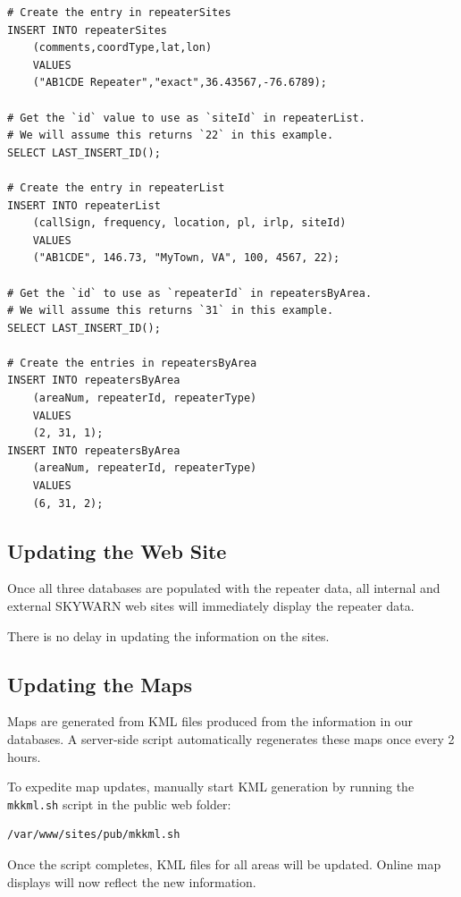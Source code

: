 \documentclass[pdflatex,letterpaper,twoside,12pt]{book}
\begin{document}
\begin{verbatim}
# Create the entry in repeaterSites
INSERT INTO repeaterSites
	(comments,coordType,lat,lon)
	VALUES
	("AB1CDE Repeater","exact",36.43567,-76.6789);

# Get the `id` value to use as `siteId` in repeaterList.
# We will assume this returns `22` in this example.
SELECT LAST_INSERT_ID();

# Create the entry in repeaterList
INSERT INTO repeaterList
	(callSign, frequency, location, pl, irlp, siteId)
	VALUES
	("AB1CDE", 146.73, "MyTown, VA", 100, 4567, 22);

# Get the `id` to use as `repeaterId` in repeatersByArea.
# We will assume this returns `31` in this example.
SELECT LAST_INSERT_ID();

# Create the entries in repeatersByArea
INSERT INTO repeatersByArea
	(areaNum, repeaterId, repeaterType)
	VALUES
	(2, 31, 1);
INSERT INTO repeatersByArea
	(areaNum, repeaterId, repeaterType)
	VALUES
	(6, 31, 2);
\end{verbatim}

\subsection{Updating the Web Site}

Once all three databases are populated with the repeater data, all internal and external SKYWARN web sites will immediately display the repeater data.

There is no delay in updating the information on the sites.

\subsection{Updating the Maps}

Maps are generated from KML files produced from the information in our databases.  A server-side script automatically regenerates these maps once every 2 hours.

To expedite map updates, manually start KML generation by running the \texttt{mkkml.sh} script in the public web folder:

\begin{verbatim}
/var/www/sites/pub/mkkml.sh
\end{verbatim}

Once the script completes, KML files for all areas will be updated.  Online map displays will now reflect the new information.
\end{document}
